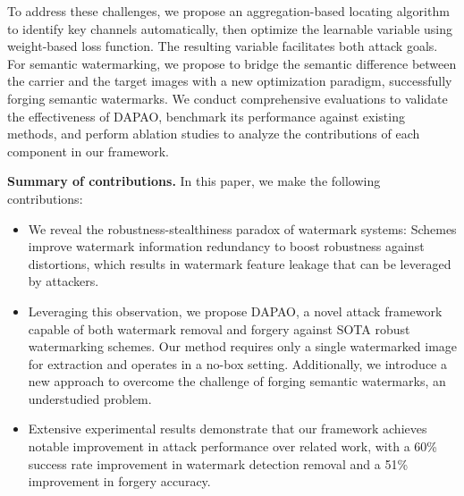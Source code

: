 To address these challenges, we propose an aggregation-based locating algorithm to identify key channels automatically, then optimize the learnable variable using weight-based loss function. The resulting variable facilitates both attack goals. For semantic watermarking, we propose to bridge the semantic difference between the carrier and the target images with a new optimization paradigm, successfully forging semantic watermarks. We conduct comprehensive evaluations to validate the effectiveness of DAPAO, benchmark its performance against existing methods, and perform ablation studies to analyze the contributions of each component in our framework.

\textbf{Summary of contributions.} In this paper, we make the following contributions:

\begin{itemize}
    \item We reveal the robustness-stealthiness paradox of watermark systems: Schemes improve watermark information redundancy to boost robustness against distortions, which results in watermark feature leakage that can be leveraged by attackers.
    \item Leveraging this observation, we propose DAPAO, a novel attack framework capable of both watermark removal and forgery against SOTA robust watermarking schemes. Our method requires only a single watermarked image for extraction and operates in a no-box setting. Additionally, we introduce a new approach to overcome the challenge of forging semantic watermarks, an understudied problem.
    
    \item Extensive experimental results demonstrate that our framework achieves notable improvement in attack performance over related work, with a 60\% success rate improvement in watermark detection removal and a 51\% improvement in forgery accuracy. 
    
\end{itemize}




